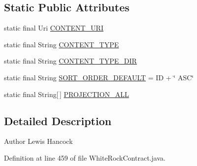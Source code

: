 \subsection*{Static Public Attributes}
\begin{DoxyCompactItemize}
\item 
static final Uri \hyperlink{classuk_1_1ac_1_1swan_1_1digitaltrails_1_1database_1_1_white_rock_contract_1_1_waypoint_with_media_afadd98ebefd7854d33ec07f74e5261dc}{C\+O\+N\+T\+E\+N\+T\+\_\+\+U\+R\+I}
\item 
static final String \hyperlink{classuk_1_1ac_1_1swan_1_1digitaltrails_1_1database_1_1_white_rock_contract_1_1_waypoint_with_media_a399e1b8c04a04ef4fcbe4598c701a199}{C\+O\+N\+T\+E\+N\+T\+\_\+\+T\+Y\+P\+E}
\item 
static final String \hyperlink{classuk_1_1ac_1_1swan_1_1digitaltrails_1_1database_1_1_white_rock_contract_1_1_waypoint_with_media_ade4b0d3e7a36643dc9ac9071430ce8e6}{C\+O\+N\+T\+E\+N\+T\+\_\+\+T\+Y\+P\+E\+\_\+\+D\+I\+R}
\item 
static final String \hyperlink{classuk_1_1ac_1_1swan_1_1digitaltrails_1_1database_1_1_white_rock_contract_1_1_waypoint_with_media_ab6e8d039d1cb0db6a69540e626806ba6}{S\+O\+R\+T\+\_\+\+O\+R\+D\+E\+R\+\_\+\+D\+E\+F\+A\+U\+L\+T} = I\+D + \char`\"{} A\+S\+C\char`\"{}
\item 
static final String\mbox{[}$\,$\mbox{]} \hyperlink{classuk_1_1ac_1_1swan_1_1digitaltrails_1_1database_1_1_white_rock_contract_1_1_waypoint_with_media_a0c156744c67dda2e480fce214762644c}{P\+R\+O\+J\+E\+C\+T\+I\+O\+N\+\_\+\+A\+L\+L}
\end{DoxyCompactItemize}


\subsection{Detailed Description}
\begin{DoxyAuthor}{Author}
Lewis Hancock 
\end{DoxyAuthor}


Definition at line 459 of file White\+Rock\+Contract.\+java.



